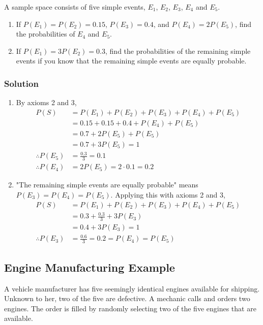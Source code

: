 \documentclass[11pt]{article}
\theoremstyle{definition}
\begin{document}
A sample space consists of five simple events, $E_1$, $E_2$, $E_3$, $E_4$ and $E_5$.

\begin{enumerate}
	\item If $P(E_1) = P(E_2) = 0.15$, $P(E_3) = 0.4$, and $P(E_4) = 2P(E_5)$, find the probabilities of $E_4$ and $E_5$.
	\item If $P(E_1) = 3P(E_2) = 0.3$, find the probabilities of the remaining simple events if you know that the remaining simple events are equally probable.
\end{enumerate}

\subsubsection*{Solution}

\begin{enumerate}
	\item By axioms 2 and 3,
		$$
			\begin{aligned}
				P(S) & = P(E_1) + P(E_2) + P(E_3) + P(E_4) + P(E_5) \\
				& = 0.15 + 0.15 + 0.4 + P(E_4) + P(E_5) \\
				& = 0.7 + 2P(E_5) + P(E_5) \\
				& = 0.7 + 3P(E_5) = 1 \\
				\therefore P(E_5) & = \frac{0.3}{3} = 0.1 \\
				\therefore P(E_4) & = 2P(E_5) = 2\cdot0.1 = 0.2
			\end{aligned}
		$$
	\item "The remaining simple events are equally probable" means $P(E_3)=P(E_4)=P(E_5)$. Applying this with axioms 2 and 3,
		$$
			\begin{aligned}
				P(S) & = P(E_1) + P(E_2) + P(E_3) + P(E_4) + P(E_5) \\
				& = 0.3 + \frac{0.3}{3} + 3P(E_3) \\
				& = 0.4 + 3P(E_3) = 1 \\
				\therefore P(E_3) & = \frac{0.6}{3} = 0.2 = P(E_4) = P(E_5)
			\end{aligned}
		$$
\end{enumerate}

\subsection{Engine Manufacturing Example}

A vehicle manufacturer has five seemingly identical engines available for shipping. Unknown to her, two of the five are defective. A mechanic calls and orders two engines. The order is filled by randomly selecting two of the five engines that are available.
\end{document}
